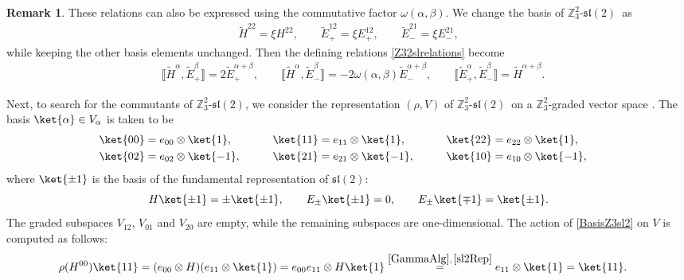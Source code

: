 \documentclass[pdftex]{sigma}
\numberwithin{equation}{section}
\theoremstyle{definition}
\newtheorem{Remark}[Theorem]{Remark}
\def\sl{\mathfrak{sl}}
\def\Zsl{$\mathbb{Z}_3^2$-$\sl(2)$}
\begin{document}
\begin{Remark}
	These relations can also be expressed using the commutative factor $\omega(\alpha,\beta)$.
	We change the basis of \Zsl \ as
	\begin{align*}
		\tilde{H}^{22} = \xi H^{22}, \qquad \tilde{E}^{12}_+ = \xi E^{12}_+, \qquad
		\tilde{E}^{21}_- = \xi E^{21}_-,
	\end{align*}
	while keeping the other basis elements unchanged. Then the defining relations \eqref{Z32slrelations} become
	\begin{align*}
		& \bigl\llbracket \tilde{H}^{\alpha}, \tilde{E}_+^{\beta} \bigr\rrbracket = 2 \tilde{E}_+^{\alpha+\beta},
		\qquad
		\bigl\llbracket \tilde{H}^{\alpha}, \tilde{E}_-^{\beta} \bigr\rrbracket = -2\omega(\alpha,\beta) \tilde{E}_-^{\alpha+\beta},
		\qquad
		\bigl\llbracket \tilde{E}_+^{\alpha}, \tilde{E}_-^{\beta} \bigr\rrbracket = \tilde{H}^{\alpha+\beta}.
	\end{align*}
\end{Remark}

Next, to search for the commutants of \Zsl, we consider the representation $(\rho,V)$ of \Zsl \ on a $\mathbb{Z}_3^2$-graded vector space
.
The basis $\ket{\alpha}\in V_{\alpha}$ is taken to be
\begin{alignat*}{4}
	&\ket{00}= e_{00} \otimes \ket{1}, \qquad&&
	\ket{11}= e_{11} \otimes \ket{1}, \qquad&&
	\ket{22}= e_{22} \otimes \ket{1},&
	\notag \\
	&\ket{02}= e_{02} \otimes \ket{-1}, \qquad &&
	\ket{21}= e_{21} \otimes \ket{-1}, \qquad &&
	\ket{10}= e_{10} \otimes \ket{-1},&
\end{alignat*}
where $\ket{\pm 1}$ is the basis of the fundamental representation of $\sl(2)$:
\begin{equation}
	H \ket{\pm 1} = \pm \ket{\pm 1}, \qquad E_{\pm} \ket{\pm 1} = 0,
	\qquad E_{\pm} \ket{\mp 1} = \ket{\pm 1}.
	\label{sl2Rep}
\end{equation}
The graded subspaces $ V_{12}$, $V_{01}$ and $ V_{20}$ are empty, while the remaining subspaces are one-dimensional.
The action of \eqref{BasisZ3sl2} on $V$ is computed as follows:
\begin{align*}
	&\rho(H^{00}) \ket{11}= (e_{00} \otimes H) (e_{11}\otimes \ket{1})
	= e_{00}e_{11} \otimes H \ket{1}
	\stackrel{\eqref{GammaAlg},\, \eqref{sl2Rep}}{=} e_{11} \otimes \ket{1}
	 = \ket{11}.
\end{align*}
\end{document}
